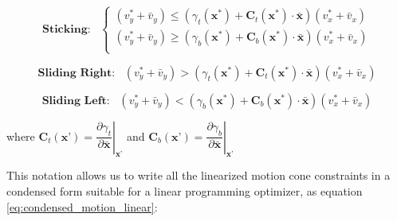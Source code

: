 \documentclass[12,twoside]{TFG-GM}
\theoremstyle{definition}
\theoremstyle{remark}
\newcommand*\diff[1]{\bar{#1}}
\begin{document}
\begin{equation} \label{eq:sticking_cone_linear}
\textbf{Sticking:}\,\,\,\,\, 
			\begin{cases}
              (v_y^* + \diff{v}_y) \leq (\gamma_t(\textbf{x}^*) + \textbf{C}_t(\textbf{x}^*)\cdot \diff{\textbf{x}})(v_x^* + \diff{v}_x)\\
              (v_y^* + \diff{v}_y) \geq (\gamma_b(\textbf{x}^*) + \textbf{C}_b(\textbf{x}^*)\cdot \diff{\textbf{x}})(v_x^* + \diff{v}_x)\\
            \end{cases}
\end{equation}

\begin{equation}\label{eq:right_cone_linear}
\textbf{Sliding Right:}\,\,\,\,\, (v_y^* + \diff{v}_y) > (\gamma_t(\textbf{x}^*) + \textbf{C}_t(\textbf{x}^*)\cdot \diff{\textbf{x}})(v_x^* + \diff{v}_x)            
\end{equation}

\begin{equation}\label{eq:left_cone_linear}
\textbf{Sliding Left:}\,\,\,\,\, (v_y^* + \diff{v}_y) < (\gamma_b(\textbf{x}^*) + \textbf{C}_b(\textbf{x}^*)\cdot \diff{\textbf{x}})(v_x^* + \diff{v}_x)
\end{equation}

where $\textbf{C}_t(\textbf{x'}) = \left.\dfrac{\partial \gamma_t}{\partial \diff{\textbf{x}}}\right|_{\textbf{x'}}$ and $\textbf{C}_b(\textbf{x'}) = \left.\dfrac{\partial \gamma_b}{\partial \diff{\textbf{x}}}\right|_{\textbf{x'}}$


This notation allows us to write all the linearized motion cone constraints in a condensed form suitable for a linear programming optimizer, as equation \ref{eq:condensed_motion_linear}:
\end{document}
